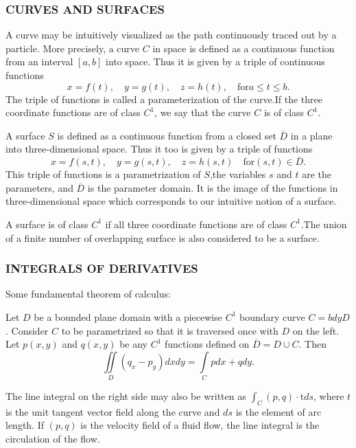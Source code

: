 \documentclass[hazy,blue,11pt]{elegantnote}
\begin{document}
\subsubsection{CURVES AND SURFACES}
A curve may be intuitively visualized as the path continuously traced out by a
particle. More precisely, a curve $C$ in space is defined as a continuous function
from an interval $[a,b]$ into space. Thus it is given by a triple of continuous
functions
\begin{equation}
    x=f(t),\quad y=g(t),\quad z=h(t),\quad \text{for}a \leq t \leq b.
\end{equation}
The triple of functions is called a parameterization of the curve.If the three coordinate functions are of class $C^1$, we say that the curve $C$ is of class $C^1$.

A surface $S$ is defined as a continuous function from a closed set $\overline D$ in a plane into three-dimensional space. Thus it too is given by a triple of functions
\begin{equation}
    x=f(s,t),\quad y=g(s,t),\quad z=h(s,t)\quad\text{for}(s,t)\in\overline{D}.
\end{equation}
This triple of functions is a parametrization of $S$,the variables $s$ and $t$ are
the parameters, and $\overline D$ is the parameter domain. It is the image of the functions in three-dimensional space which corresponds to our intuitive notion of a surface.

A surface is of class $C^1$ if all three coordinate functions are of class $C^1$.The union of a finite number of overlapping surface is also considered to be a surface.

\subsubsection{INTEGRALS OF DERIVATIVES}
Some fundamental theorem of calculus:
\begin{theorem}
    Let $D$ be a bounded plane domain with a piecewise $C^1$ boundary curve $C=bdyD$. Consider $C$ to be parametrized so that it is traversed once with $D$ on the left. Let $p(x,y)$ and $q(x,y)$ be any $C^1$ functions defined on $\overline{D}=D\cup C$. Then
\begin{equation}
    \iint\limits_D(q_x-p_y)dxdy=\int\limits_Cpdx+qdy.
\end{equation}
\end{theorem}

The line integral on the right side may also be written as $\int_C\left(p,q\right)\cdot\text{t}ds$, where $t$ is the unit tangent vector field along the curve and $ds$ is the element of arc length. If $(p,q)$ is the velocity field of a fluid flow, the line integral is the circulation of the flow.
\end{document}
